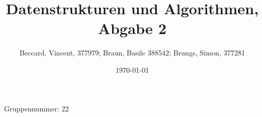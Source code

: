 \documentclass{article}
\title{Datenstrukturen und Algorithmen, Abgabe 2}
\author{Beccard, Vincent, 377979; Braun, Basile 388542; Brungs, Simon, 377281}
\date{\today}
\begin{document}
\noindent
Gruppennummer: 22%
\begingroup
\let\newpage\relax%
\maketitle
\endgroup
\renewcommand{\thesubsection}{\alph{subsection}}



\end{document}
